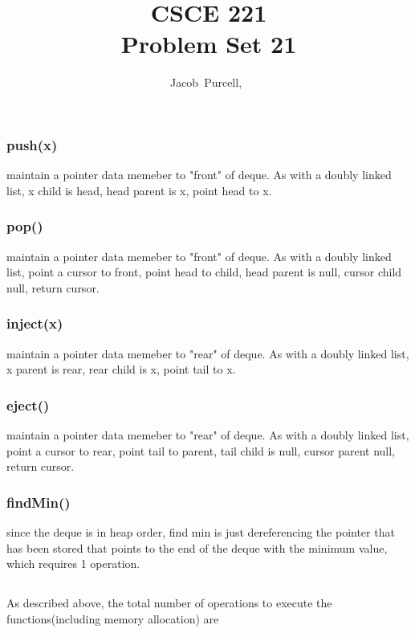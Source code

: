 \documentclass[journal]{IEEEtran}
\begin{document}
\title{CSCE 221 \\ Problem Set 21}

\author{Jacob~Purcell,~}

\maketitle
\section{}

\subsection{}
\subsubsection{push(x)}
maintain a pointer data memeber to "front" of deque.
As with a doubly linked list, x child is head, head parent is x, point head to x. 
\subsubsection{pop()}
maintain a pointer data memeber to "front" of deque.
As with a doubly linked list, point a cursor to front, point 
head to child, head parent is null, cursor child null, return cursor. 
\subsubsection{inject(x)}
maintain a pointer data memeber to "rear" of deque.
As with a doubly linked list, x parent is rear, rear child is x, point tail to x.
\subsubsection{eject()}
    maintain a pointer data memeber to "rear" of deque.
    As with a doubly linked list, point a cursor to rear, point 
    tail to parent, tail child is null, cursor parent null, return cursor. 
\subsubsection{findMin()}
    since the deque is in heap order, 
    find min is just dereferencing the pointer
    that has been stored that points to the end 
    of the  deque with the minimum value, 
    which requires 1 operation. 

\subsection{}
As described above, the total number of operations to execute the functions(including memory allocation) are
\end{document}
